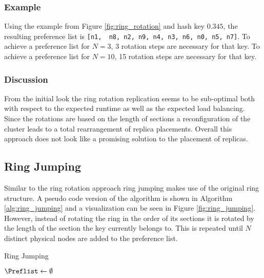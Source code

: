 \subsubsection{Example}
Using the example from Figure \ref{fig:ring_rotation} and hash key $0.345$, the resulting preference list is \lstinline![n1,  n8, n2, n9, n4, n3, n6, n0, n5, n7]!.
To achieve a preference list for $N=3$, 3 rotation steps are necessary for that key.
To achieve a preference list for $N=10$, 15 rotation steps are necessary for that key.

\subsubsection{Discussion}
From the initial look the ring rotation replication seems to be sub-optimal both with respect to the expected runtime as well as the expected load balancing.
Since the rotations are based on the length of sections a reconfiguration of the cluster leads to a total rearrangement of replica placements.
Overall this approach does not look like a promising solution to the placement of replicas.

\subsection{Ring Jumping}
Similar to the ring rotation approach ring jumping  makes use of the original ring structure.
A pseudo code version of the algorithm is shown in Algorithm \ref{alg:ring_jumping} and a visualization can be seen in Figure \ref{fig:ring_jumping}.
However, instead of rotating the ring in the order of its sections it is rotated by the length of the section the key currently belongs to.
This is repeated until $N$ distinct physical nodes are added to the preference list.

\begin{algorithm}[H]
\caption{Ring Jumping}
\label{alg:ring_jumping}
$\Preflist \leftarrow \emptyset$\;
\end{algorithm}

